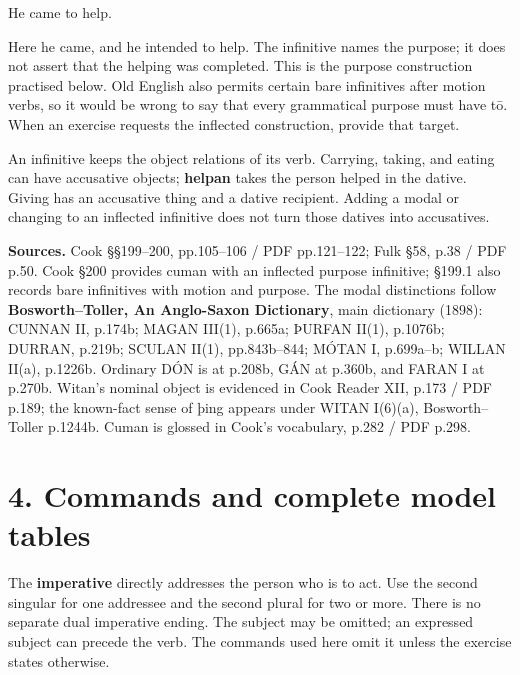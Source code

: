 He came to help.

Here he came, and he intended to help. The infinitive names the purpose; it does not assert that the helping was completed. This is the purpose construction practised below. Old English also permits certain bare infinitives after motion verbs, so it would be wrong to say that every grammatical purpose must have tō. When an exercise requests the inflected construction, provide that target.

An infinitive keeps the object relations of its verb. Carrying, taking, and eating can have accusative objects; \textbf{helpan} takes the person helped in the dative. Giving has an accusative thing and a dative recipient. Adding a modal or changing to an inflected infinitive does not turn those datives into accusatives.

\textbf{Sources.} Cook §§199–200, pp.105–106 /\allowbreak{} PDF pp.121–122; Fulk §58, p.38 /\allowbreak{} PDF p.50. Cook §200 provides cuman with an inflected purpose infinitive; §199.1 also records bare infinitives with motion and purpose. The modal distinctions follow \textbf{Bosworth–Toller, An Anglo-Saxon Dictionary}, main dictionary (1898): CUNNAN II, p.174b; MAGAN III(1), p.665a; ÞURFAN II(1), p.1076b; DURRAN, p.219b; SCULAN II(1), pp.843b–844; MÓTAN I, p.699a–b; WILLAN II(a), p.1226b. Ordinary DÓN is at p.208b, GÁN at p.360b, and FARAN I at p.270b. Witan’s nominal object is evidenced in Cook Reader XII, p.173 /\allowbreak{} PDF p.189; the known-fact sense of þing appears under WITAN I(6)(a), Bosworth–Toller p.1244b. Cuman is glossed in Cook’s vocabulary, p.282 /\allowbreak{} PDF p.298.

\section*{4. Commands and complete model tables}

The \textbf{imperative} directly addresses the person who is to act. Use the second singular for one addressee and the second plural for two or more. There is no separate dual imperative ending. The subject may be omitted; an expressed subject can precede the verb. The commands used here omit it unless the exercise states otherwise.


